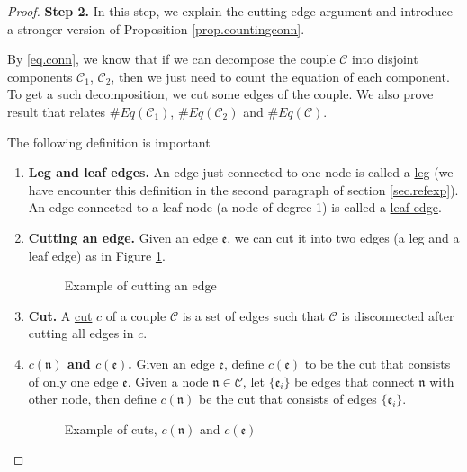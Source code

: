 \begin{proof}
\textbf{Step 2.} In this step, we explain the cutting edge argument and introduce a stronger version of Proposition \ref{prop.countingconn}.

By \eqref{eq.conn}, we know that if we can decompose the couple $\mathcal{C}$ into disjoint components $\mathcal{C}_1$, $\mathcal{C}_2$, then we just need to count the equation of each component. To get a such decomposition, we cut some edges of the couple. We also prove result that relates $\#Eq(\mathcal{C}_1)$, $\#Eq(\mathcal{C}_2)$ and $\#Eq(\mathcal{C})$.

The following definition is important 

\begin{defn}
\begin{enumerate}
    \item \textbf{Leg and leaf edges.} An edge just connected to one node is called a \underline{leg} (we have encounter this definition in the second paragraph of section \ref{sec.refexp}). An edge connected to a leaf node (a node of degree 1) is called a \underline{leaf edge}.
    \item \textbf{Cutting an edge.} Given an edge $\mathfrak{e}$, we can cut it into two edges (a leg and a leaf edge) as in Figure \ref{fig.cutedge}.
    
    \begin{figure}[H]
        \caption{Example of cutting an edge}
        \centering
        \label{fig.cutedge}
    \end{figure}

    \item \textbf{Cut.} A \underline{cut} $c$ of a couple $\mathcal{C}$ is a set of edges such that $\mathcal{C}$ is disconnected after cutting all edges in $c$.
    \item \textbf{$c(\mathfrak{n})$ and $c(\mathfrak{e})$.} Given an edge $\mathfrak{e}$, define  $c(\mathfrak{e})$ to be the cut that consists of only one edge $\mathfrak{e}$. Given a node $\mathfrak{n}\in \mathcal{C}$, let $\{\mathfrak{e}_{i}\}$ be edges that connect $\mathfrak{n}$ with other node, then define $c(\mathfrak{n})$ be the cut that consists of edges $\{\mathfrak{e}_{i}\}$.
    
    \begin{figure}[H]
        \caption{Example of cuts, $c(\mathfrak{n})$ and $c(\mathfrak{e})$}
        \centering
        \label{fig.c(n)c(e)}
    \end{figure}
\end{enumerate}
\end{defn}


\end{proof}
